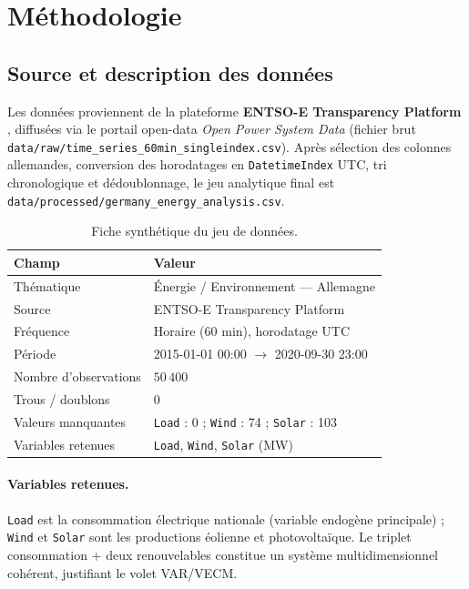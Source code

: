 \section{Méthodologie}
\label{sec:methodo}

\subsection{Source et description des données}
Les données proviennent de la plateforme \textbf{ENTSO-E Transparency Platform}
\cite{entsoe}, diffusées via le portail open-data \emph{Open Power System Data}
(fichier brut \texttt{data/raw/time\_series\_60min\_singleindex.csv}). Après
sélection des colonnes allemandes, conversion des horodatages en
\texttt{DatetimeIndex} UTC, tri chronologique et dédoublonnage, le jeu
analytique final est \texttt{data/processed/germany\_energy\_analysis.csv}.

\begin{table}[H]
\centering
\caption{Fiche synthétique du jeu de données.}
\label{tab:donnees}
\begin{tabular}{ll}
\toprule
Champ & Valeur \\
\midrule
Thématique & Énergie / Environnement --- Allemagne \\
Source & ENTSO-E Transparency Platform \\
Fréquence & Horaire (60 min), horodatage UTC \\
Période & 2015-01-01 00:00 $\rightarrow$ 2020-09-30 23:00 \\
Nombre d'observations & \(50\,400\) \\
Trous / doublons & \(0\) \\
Valeurs manquantes & \texttt{Load} : 0 ; \texttt{Wind} : 74 ; \texttt{Solar} : 103 \\
Variables retenues & \texttt{Load}, \texttt{Wind}, \texttt{Solar} (MW) \\
\bottomrule
\end{tabular}
\end{table}

\paragraph{Variables retenues.}
\texttt{Load} est la consommation électrique nationale (variable endogène
principale) ; \texttt{Wind} et \texttt{Solar} sont les productions éolienne et
photovoltaïque. Le triplet consommation + deux renouvelables constitue un
système multidimensionnel cohérent, justifiant le volet VAR/VECM.

